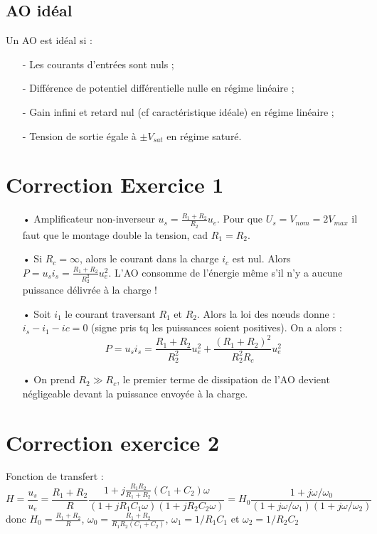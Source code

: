 \documentclass{report}
\begin{document}
\subsection*{AO idéal}

Un AO est idéal si : 
\begin{itemize}
	\item[-] Les courants d'entrées sont nuls ;
	\item[-] Différence de potentiel différentielle nulle en régime linéaire ;
	\item[-] Gain infini et retard nul (cf caractéristique idéale) en régime linéaire ;
	\item[-] Tension de sortie égale à $\pm V_{sat}$ en régime saturé.
	 
\end{itemize}


\section*{Correction Exercice 1}

\begin{itemize}
	\item[•] Amplificateur non-inverseur $u_s = \frac{R_1+R_2}{R_2}u_e$. Pour que $U_s = V_{nom}=2V_{max}$ il faut que le montage double la tension, cad $R_1=R_2$.
	\item[•]  Si $R_c=\infty$, alors le courant dans la charge $i_c$ est nul. Alors $P=u_si_s= \frac{R_1+R_2}{R_2^2}u_e^2$. L'AO consomme de l'énergie même s'il n'y a aucune puissance délivrée à la charge !
	\item[•] Soit $i_1$ le courant traversant $R_1$ et $R_2$. Alors la loi des nœuds donne : $i_s-i_1-ic=0$ (signe pris tq les puissances soient positives). On a alors :
	\begin{equation}
		P=u_si_s=\frac{R_1+R_2}{R_2^2}u_e^2+\frac{(R_1+R_2)^2}{R_2^2R_c}u_e^2
	\end{equation}
	\item[•] On prend $R_2\gg R_c$, le premier terme de dissipation de l'AO devient négligeable devant la puissance envoyée à la charge.
\end{itemize}

\section*{Correction exercice 2}
Fonction de transfert :
\begin{equation}
	H=\frac{u_s}{u_e}=\frac{R_1+R_2}{R}\frac{1+j\frac{R_1R_2}{R_1+R_2}(C_1+C_2)\omega}{(1+jR_1C_1\omega)(1+jR_2C_2\omega)}=H_0\frac{1+j\omega/\omega_0}{(1+j\omega/\omega_1)(1+j\omega/\omega_2)}
\end{equation}
donc $H_0=\frac{R_1+R_2}{R}$, $\omega_0=\frac{R_1+R_2}{R_1R_2(C_1+C_2)}$, $\omega_1=1/R_1C_1$ et $\omega_2=1/R_2C_2$
\end{document}
